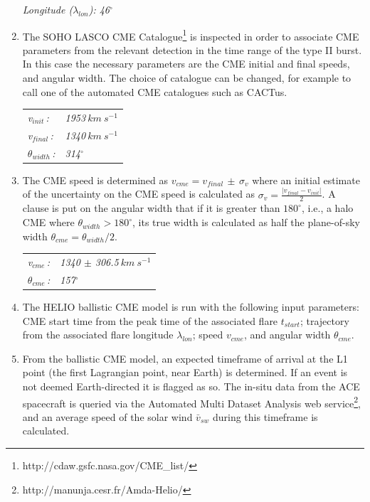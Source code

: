\documentclass[namedreferences]{SolarPhysics}
\begin{document}
\begin{article}
\begin{enumerate}
\emph{Longitude ($\lambda_{lon}$): 46$^{\circ}$}

\item The SOHO LASCO CME Catalogue\footnote{http://cdaw.gsfc.nasa.gov/CME\_list/} is inspected in order to associate CME parameters from the relevant detection in the time range of the type II burst. In this case the necessary parameters are the CME initial and final speeds, and angular width. The choice of catalogue can be changed, for example to call one of the automated CME catalogues such as CACTus.

\begin{tabular}{l l}
\emph{v$_{init}$\,:} & \emph{1953$~km~s^{-1}$} \\
\emph{v$_{final}$\,:} & \emph{1340$~km~s^{-1}$} \\
\emph{$\theta_{width}$\,:} & \emph{314$^{\circ}$} \\
\end{tabular}

\item The CME speed is determined as $v_{cme} = v_{final} \,\pm\, \sigma_v$ where an initial estimate of the uncertainty on the CME speed is calculated as $\sigma_v=\frac{\left|v_{final}-v_{init}\right|}{2}$. A clause is put on the angular width that if it is greater than $180^{\circ}$, i.e., a halo CME where $\theta_{width}>180^{\circ}$, its true width is calculated as half the plane-of-sky width $\theta_{cme}=\theta_{width}/2$.

\begin{tabular}{l l}
\emph{v$_{cme}$\,:} & \emph{1340 $\pm$ 306.5$~km~s^{-1}$} \\
\emph{$\theta_{cme}$\,:} & \emph{157$^{\circ}$} \\
\end{tabular}

\item The HELIO ballistic CME model is run with the following input parameters: CME start time from the peak time of the associated flare $t_{start}$; trajectory from the associated flare longitude $\lambda_{lon}$; speed $v_{cme}$, and angular width $\theta_{cme}$.


\item From the ballistic CME model, an expected timeframe of arrival at the L1 point (the first Lagrangian point, near Earth) is determined. If an event is not deemed Earth-directed it is flagged as so. The in-situ data from the ACE spacecraft is queried via the Automated Multi Dataset Analysis web service\footnote{http://manunja.cesr.fr/Amda-Helio/}, and an average speed of the solar wind $\bar{v}_{sw}$ during this timeframe is calculated. 


\end{enumerate}
\end{article}
\end{document}
